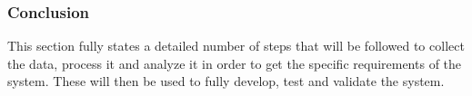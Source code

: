 \documentclass{article}
\begin{document}

\subsubsection{Conclusion}
This section fully states a detailed number of steps that will be followed to collect the data, process it and analyze it in order to get the specific requirements of the system. These will then be used to fully develop, test and validate the system. 


\newpage
\printbibliography
\end{document}

